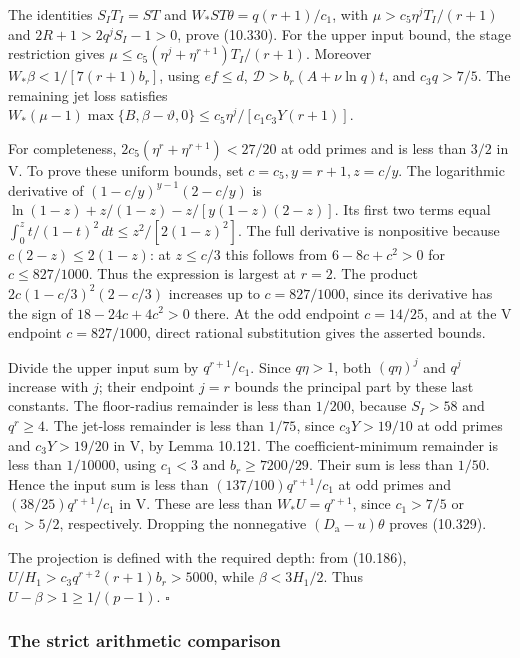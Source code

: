 \documentclass[
  11pt,
  a4paper,
]{article}
\begin{document}
The identities \(S_IT_I=ST\) and \(W_*ST\theta=q(r+1)/c_1\), with
\(\mu>c_5\eta^jT_I/(r+1)\) and \(2R+1>2q^jS_I-1>0\), prove (10.330). For
the upper input bound, the stage restriction gives
\(\mu\le c_5(\eta^j+\eta^{r+1})T_I/(r+1)\). Moreover
\(W_*\beta<1/[7(r+1)b_r]\), using \(ef\le d\),
\(\mathcal D>b_r(A+\nu\ln q)t\), and \(c_3q>7/5\). The remaining jet
loss satisfies
\(W_*(\mu-1)\max\{B,\beta-\vartheta,0\}\le c_5\eta^j/[c_1c_3Y(r+1)]\).

For completeness, \(2c_5(\eta^r+\eta^{r+1})<27/20\) at odd primes and is
less than \(3/2\) in V. To prove these uniform bounds, set
\(c=c_5,y=r+1,z=c/y\). The logarithmic derivative of
\((1-c/y)^{y-1}(2-c/y)\) is \(\ln(1-z)+z/(1-z)-z/[y(1-z)(2-z)]\). Its
first two terms equal \(\int_0^z t/(1-t)^2\,dt\le z^2/[2(1-z)^2]\). The
full derivative is nonpositive because \(c(2-z)\le2(1-z)\): at
\(z\le c/3\) this follows from \(6-8c+c^2>0\) for \(c\le827/1000\). Thus
the expression is largest at \(r=2\). The product \(2c(1-c/3)^2(2-c/3)\)
increases up to \(c=827/1000\), since its derivative has the sign of
\(18-24c+4c^2>0\) there. At the odd endpoint \(c=14/25\), and at the V
endpoint \(c=827/1000\), direct rational substitution gives the asserted
bounds.

Divide the upper input sum by \(q^{r+1}/c_1\). Since \(q\eta>1\), both
\((q\eta)^j\) and \(q^j\) increase with \(j\); their endpoint \(j=r\)
bounds the principal part by these last constants. The floor-radius
remainder is less than \(1/200\), because \(S_I>58\) and \(q^r\ge4\).
The jet-loss remainder is less than \(1/75\), since \(c_3Y>19/10\) at
odd primes and \(c_3Y>19/20\) in V, by Lemma 10.121. The
coefficient-minimum remainder is less than \(1/10000\), using \(c_1<3\)
and \(b_r\ge7200/29\). Their sum is less than \(1/50\). Hence the input
sum is less than \((137/100)q^{r+1}/c_1\) at odd primes and
\((38/25)q^{r+1}/c_1\) in V. These are less than \(W_*U=q^{r+1}\), since
\(c_1>7/5\) or \(c_1>5/2\), respectively. Dropping the nonnegative
\((D_{\mathrm a}-u)\theta\) proves (10.329).

The projection is defined with the required depth: from (10.186),
\(U/H_1>c_3q^{r+2}(r+1)b_r>5000\), while \(\beta<3H_1/2\). Thus
\(U-\beta>1\ge1/(p-1)\). \(\square\)

\subsubsection{The strict arithmetic
comparison}\label{the-strict-arithmetic-comparison}
\end{document}
